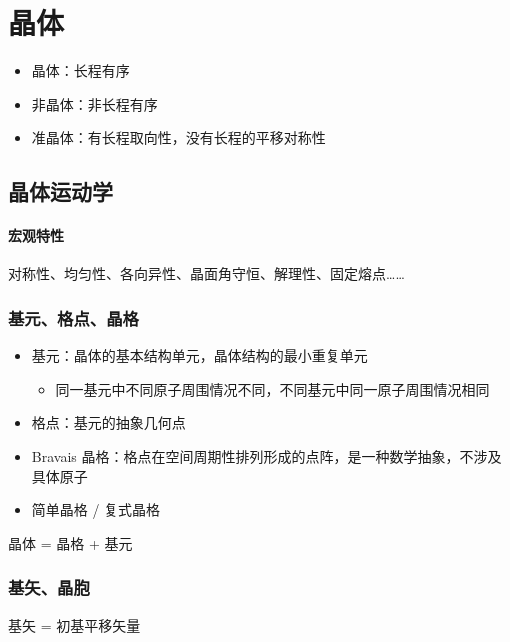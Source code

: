 \section{晶体}

\begin{itemize}
    \item 晶体：长程有序
    \item 非晶体：非长程有序
    \item 准晶体：有长程取向性，没有长程的平移对称性
\end{itemize}

\subsection{晶体运动学}

\paragraph{宏观特性}

对称性、均匀性、各向异性、晶面角守恒、解理性、固定熔点……

\subsubsection{基元、格点、晶格}

\begin{itemize}
    \item 基元：晶体的基本结构单元，晶体结构的最小重复单元 \begin{itemize}
              \item 同一基元中不同原子周围情况不同，不同基元中同一原子周围情况相同
          \end{itemize}
    \item 格点：基元的抽象几何点
    \item Bravais 晶格：格点在空间周期性排列形成的点阵，是一种数学抽象，不涉及具体原子
    \item 简单晶格 / 复式晶格
\end{itemize}

\begin{center}
    晶体 = 晶格 + 基元
\end{center}

\subsubsection{基矢、晶胞}

基矢 = 初基平移矢量

